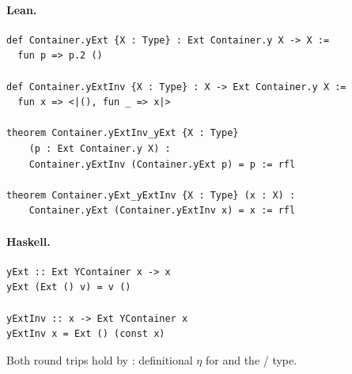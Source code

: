 \documentclass[11pt,a4paper]{article}
\begin{document}
\paragraph{Lean.}
\begin{lstlisting}[style=lean]
def Container.yExt {X : Type} : Ext Container.y X -> X :=
  fun p => p.2 ()

def Container.yExtInv {X : Type} : X -> Ext Container.y X :=
  fun x => <|(), fun _ => x|>

theorem Container.yExtInv_yExt {X : Type}
    (p : Ext Container.y X) :
    Container.yExtInv (Container.yExt p) = p := rfl

theorem Container.yExt_yExtInv {X : Type} (x : X) :
    Container.yExt (Container.yExtInv x) = x := rfl
\end{lstlisting}

\paragraph{Haskell.}
\begin{lstlisting}[style=haskell]
yExt :: Ext YContainer x -> x
yExt (Ext () v) = v ()

yExtInv :: x -> Ext YContainer x
yExtInv x = Ext () (const x)
\end{lstlisting}

\begin{fidelitynote}
Both round trips hold by : definitional $\eta$ for  and the
 /  type.
\end{fidelitynote}
\end{document}
